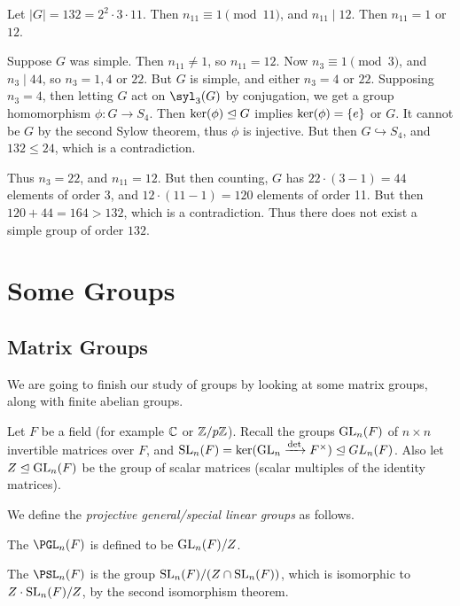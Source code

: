 \documentclass[a4paper]{scrartcl}
\begin{document}
\begin{example}
	Let $|G| = 132 = 2^2 \cdot 3 \cdot 11$. Then $n_{11} \equiv 1 \pmod{11}$, and $n_{11} \mid 12$. Then $n_{11} = 1$ or $12$.

	Suppose $G$ was simple. Then $n_{11} \neq 1$, so $n_{11} = 12$. Now $n_3 \equiv 1 \pmod{3}$, and $n_3 \mid 44$, so $n_3 = 1, 4$ or $22$. But $G$ is simple, and either $n_3 = 4$ or $22$. Supposing $n_3 = 4$, then letting $G$ act on $\syl_3(G)$ by conjugation, we get a group homomorphism $\phi: G \rightarrow S_4$. Then $\operatorname{ker}(\phi) \trianglelefteq G$ implies $\operatorname{ker}(\phi) = \{e\}$ or $G$. It cannot be $G$ by the second Sylow theorem, thus $\phi$ is injective. But then $G \hookrightarrow S_4$, and $132 \leq 24$, which is a contradiction.

	Thus $n_3 = 22$, and $n_{11} = 12$. But then counting, $G$ has $22 \cdot (3 - 1) = 44$ elements of order 3, and $12 \cdot (11 - 1) = 120$ elements of order 11. But then $120 + 44 = 164 > 132$, which is a contradiction. Thus there does not exist a simple group of order $132$. 
\end{example}

\section{Some Groups}

\subsection{Matrix Groups}

We are going to finish our study of groups by looking at some matrix groups, along with finite abelian groups.


Let $F$ be a field (for example $\mathbb{C}$ or $\mathbb{Z}/p\mathbb{Z}$). 
Recall the groups $\operatorname{GL}_n(F)$ of $n \times n$ 
invertible matrices over $F$, and $\operatorname{SL}_n(F) = \operatorname{ker}(\operatorname{GL}_n \xrightarrow{\det} F^\times) \trianglelefteq GL_n(F)$.
Also let $Z \trianglelefteq \operatorname{GL}_n(F)$ be the group of scalar matrices (scalar multiples of the identity matrices). 

We define the \emph{projective general/special linear groups} as follows.

\begin{definition}
	The  $\PGL_n(F)$ is defined to be $\operatorname{GL}_n(F) / Z$.
\end{definition}

\begin{definition}
	The  $\PSL_n(F)$ is the group $\operatorname{SL}_n(F) / (Z \cap  \operatorname{SL}_n(F))$, which is isomorphic to $Z\cdot \operatorname{SL}_n(F) / Z$, by the second isomorphism theorem.
\end{definition}
\end{document}
